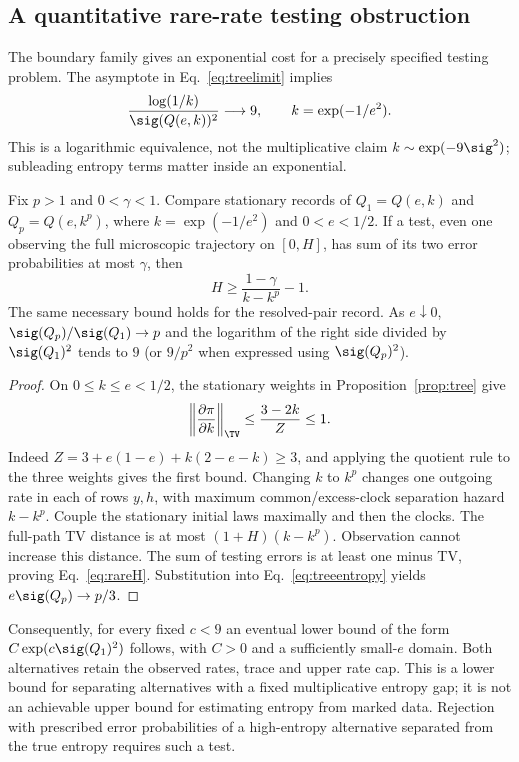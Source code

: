 \subsection{A quantitative rare-rate testing obstruction}\label{sec:rare}
The boundary family gives an exponential cost for a precisely specified testing problem. The asymptote in Eq.~\eqref{eq:treelimit} implies
\begin{equation}
 \frac{\log(1/k)}{\sig(Q(e,k))^2}\longrightarrow9,
 \qquad k=\exp(-1/e^2).\label{eq:lograre}
\end{equation}
This is a logarithmic equivalence, not the multiplicative claim
$k\sim\exp(-9\sig^2)$; subleading entropy terms matter inside an exponential.

\begin{proposition}\label{prop:rare}
Fix $p>1$ and $0<\gamma<1$. Compare stationary records of
$Q_1=Q(e,k)$ and $Q_p=Q(e,k^p)$, where $k=\exp(-1/e^2)$ and $0<e<1/2$.
If a test, even one observing the full microscopic trajectory on $[0,H]$, has sum of its two error probabilities at most $\gamma$, then
\begin{equation}
 H\ge\frac{1-\gamma}{k-k^p}-1.\label{eq:rareH}
\end{equation}
The same necessary bound holds for the resolved-pair record. As $e\downarrow0$, $\sig(Q_p)/\sig(Q_1)\to p$ and the logarithm of the right side divided by $\sig(Q_1)^2$ tends to $9$ (or $9/p^2$ when expressed using $\sig(Q_p)^2$).
\end{proposition}
\begin{proof}
On $0\le k\le e<1/2$, the stationary weights in Proposition~\ref{prop:tree} give
\begin{equation}
 \left\|\frac{\partial\pi}{\partial k}\right\|_{\TV}
 \le\frac{3-2k}{Z}\le1.
\end{equation}
Indeed $Z=3+e(1-e)+k(2-e-k)\ge3$, and applying the quotient rule to the three weights gives the first bound. Changing $k$ to $k^p$ changes one outgoing rate in each of rows $y,h$, with maximum common/excess-clock separation hazard $k-k^p$. Couple the stationary initial laws maximally and then the clocks. The full-path TV distance is at most $(1+H)(k-k^p)$. Observation cannot increase this distance. The sum of testing errors is at least one minus TV, proving Eq.~\eqref{eq:rareH}. Substitution into Eq.~\eqref{eq:treeentropy} yields $e\sig(Q_p)\to p/3$.
\end{proof}

Consequently, for every fixed $c<9$ an eventual lower bound of the form $C\exp(c\sig(Q_1)^2)$ follows, with $C>0$ and a sufficiently small-$e$ domain. Both alternatives retain the observed rates, trace and upper rate cap. This is a lower bound for separating alternatives with a fixed multiplicative entropy gap; it is not an achievable upper bound for estimating entropy from marked data. Rejection with prescribed error probabilities of a high-entropy alternative separated from the true entropy requires such a test.

